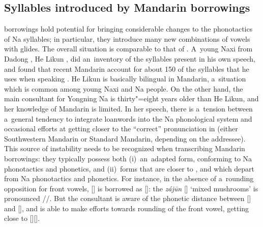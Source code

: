 			
			\subsection{Syllables introduced by Mandarin borrowings}
			\label{sec:syllablesintroducedbychineseborrowings}
			
			 borrowings hold potential for bringing considerable changes to the phonotactics of Na
			syllables; in particular, they introduce many new combinations of vowels with glides. The
			overall situation is comparable to that of . A~young {Naxi} from Dadong , He Likun , did
			an~inventory of the syllables present in his own speech, and found that recent {Mandarin} 
			account for about 150 of the syllables that he uses when speaking  \citep{michaudetal2015c}. He
			Likun is basically bilingual in {Mandarin}, a~situation which is common among young {Naxi} and Na
			people. On the other hand, the main consultant for Yongning Na is thirty"=eight years older than He Likun, and
			her knowledge of {Mandarin} is limited. In her speech, there is a~tension between a~general tendency to
			integrate loanwords into the Na phonological system and occasional efforts at getting closer to the “correct” pronunciation in  (either Southwestern
			{Mandarin} or Standard {Mandarin}, depending on the addressee). This source of instability needs to be recognized when transcribing {Mandarin} borrowings: they
			typically possess both (i)~an~adapted form, conforming to Na phonotactics and phonetics, and
			(ii)~forms that are closer to , and which depart from Na phonotactics and phonetics. For
			instance, in the absence of a~rounding opposition for front vowels,  [] is borrowed as
			[]: the  \textit{zájūn}  [] ‘mixed mushrooms’ is pronounced
			//. But the consultant is aware of the phonetic distance between [] and
			[], and is able to make efforts towards rounding of the front vowel, getting close to
			[]{\kern2pt}[]. 
			

